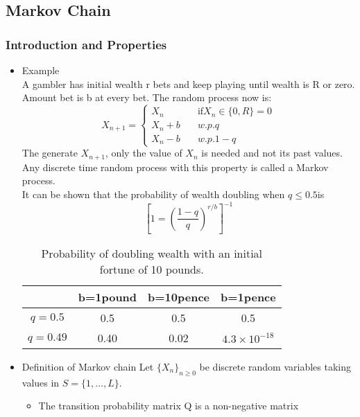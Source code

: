 \documentclass[12pt]{article}
\begin{document}
\subsection{Markov Chain}
\subsubsection{Introduction and Properties}
\begin{itemize}
\item Example \\
A gambler has initial wealth r bets and keep playing until wealth is R or zero. Amount bet is b at every bet. The random process now is:
\[
X_{n+1} = \left\{ \begin{array}{ll}
					X_n \quad & \textrm{if} X_n \in \{0,R \}=0 \\
					X_n + b \quad & w.p. q \\
					X_n - b \quad & w.p. 1-q
\end{array} \right.
\] 
The generate $X_{n+1}$, only the value of $X_n$ is needed and not its past values. Any discrete time random process with this property is called a Markov process. \\
It can be shown that the probability of wealth doubling when $q \le 0.5$is 
\[
\left[ 1 = \left(\frac{1-q}{q}\right)^{r/b}\right]^{-1}
\]

\begin{table}[H]
    \centering
    \begin{tabular}{ |c|c|c|c|} 
    \hline
     & b=1pound & b=10pence  & b=1pence\\
    \hline
    \hline
    $q=0.5$ & 0.5 & 0.5 & 0.5 \\ 
    $q=0.49$ & 0.40 & 0.02 & $4.3 \times 10^{-18}$\\ 
    \hline
    \end{tabular}
    \caption{Probability of doubling wealth with an initial fortune of 10 pounds.}
\end{table}


\item Definition of Markov chain Let $\{ X_n\}_{n \ge 0}$ be discrete random variables taking values in $S = \{1,...,L \}.$
\begin{itemize}
\item The transition probability matrix Q is a non-negative matrix 
\end{itemize}


\end{itemize}
\end{document}
